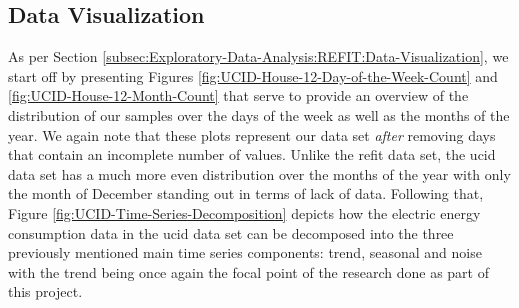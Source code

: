 \subsection{Data Visualization}
\label{subsec:Exploratory-Data-Analysis:UCID:Data-Visualization}
As per Section \ref{subsec:Exploratory-Data-Analysis:REFIT:Data-Visualization}, we start off by presenting Figures \ref{fig:UCID-House-12-Day-of-the-Week-Count} and \ref{fig:UCID-House-12-Month-Count} that serve to provide an overview of the distribution of our samples over the days of the week as well as the months of the year. We again note that these plots represent our data set \textit{after} removing days that contain an incomplete number of values. Unlike the \gls{refit} data set, the \gls{ucid} data set has a much more even distribution over the months of the year with only the month of December standing out in terms of lack of data. Following that, Figure \ref{fig:UCID-Time-Series-Decomposition} depicts how the electric energy consumption data in the \gls{ucid} data set can be decomposed into the three previously mentioned main time series components: trend, seasonal and noise with the trend being once again the focal point of the research done as part of this project.

